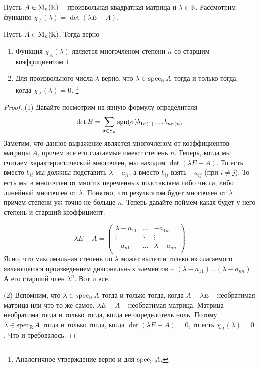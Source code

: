 Пусть $A\in\operatorname{M}_{n}(\mathbb R)$ -- произвольная квадратная матрица и $\lambda \in\mathbb R$.
Рассмотрим функцию $\chi_A(\lambda) = \det(\lambda E - A)$.

\begin{claim}
\label{claim::CharSpec}
Пусть $A\in\operatorname{M}_{n}(\mathbb R)$.
Тогда верно
\begin{enumerate}
\item Функция $\chi_A(\lambda)$ является многочленом степени $n$ со старшим коэффициентом $1$.

\item Для произвольного числа $\lambda$ верно, что $\lambda \in\operatorname{spec}_\mathbb R A$ тогда и только тогда, когда $\chi_A(\lambda) = 0$.%
\footnote{Аналогичное утверждение верно и для $\operatorname{spec}_\mathbb C A$.}
\end{enumerate}
\end{claim}
\begin{proof}
(1) Давайте посмотрим на явную формулу определителя
\[
\det B = \sum_{\sigma\in\operatorname{S}_{n}}\operatorname{sgn}(\sigma) b_{1\sigma(1)}\ldots b_{n\sigma(n)}
\]
Заметим, что данное выражение является многочленом от коэффициентов матрицы $A$, причем все его слагаемые имеют степень $n$.
Теперь, когда мы считаем характеристический многочлен, мы находим $\det(\lambda E - A)$.
То есть вместо $b_{ii}$ мы должны подставить  $\lambda - a_{ii}$, а вместо $b_{ij}$ взять $-a_{ij}$ (при $i\neq j$).
То есть мы в многочлен от многих переменных подставляем либо числа, либо линейный многочлен от $\lambda$.
Понятно, что результатом будет многочлен от $\lambda$ причем степени уж точно не больше $n$.
Теперь давайте поймем какая будет у него степень и старший коэффициент.

\[
\lambda E - A = 
\begin{pmatrix}
{\lambda - a_{11}}&{\ldots}&{-a_{1n}}\\
{\vdots}&{\ddots}&{\vdots}\\
{-a_{n1}}&{\ldots}&{\lambda - a_{nn}}\\
\end{pmatrix}
\]
Ясно, что максимальная степень по $\lambda$ может вылезти только из слагаемого являющегося произведением диагональных элементов -- $(\lambda - a_{11}) \ldots (\lambda - a_{nn})$.
А его старший член $\lambda^n$.
Вот и все.

(2) Вспомним, что $\lambda\in\operatorname{spec}_\mathbb R A$ тогда и только тогда, когда $A - \lambda E$ -- необратимая матрица или что то же самое,  $\lambda E - A$ -- необратимая матрица.
Матрица необратима тогда и только тогда, когда ее определитель ноль.
Потому $\lambda \in\operatorname{spec}_\mathbb R A$ тогда и только тогда, когда $\det (\lambda E - A) = 0$, то есть $\chi_A(\lambda) = 0$.
Что и требовалось.
\end{proof}

